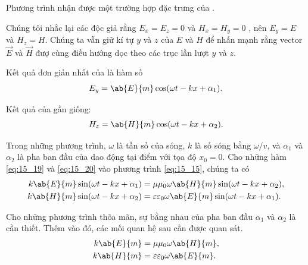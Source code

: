 \noindent
Phương trình nhận được một trường hợp  đặc trưng của .

Chúng tôi nhắc lại các độc giả rằng $E_x=E_z=0$ và $H_x=H_y=0$ , nên $E_y=E$ và $H_z=H$.
Chúng ta vẫn giữ kí tự  $y$ và $z$ của $E$ và $H$ để nhấn mạnh rằng vector $\vec{E}$ và $\vec{H}$ đượ cùng điều hướng dọc theo các trục lần lượt  $y$ và $z$.


Kết quả đơn giản nhất của  là hàm số
\begin{equation}\label{eq:15_19}
    E_y = \ab{E}{m} \cos(\omega t - kx + \alpha_1).
\end{equation}

\noindent
Kết quả của  gần giống:
\begin{equation}\label{eq:15_20}
    H_z = \ab{H}{m} \cos(\omega t - kx + \alpha_2).
\end{equation}

\noindent
Trong những phương trình, $\omega$ là tần số của sóng, $k$ là số sóng bằng $\omega/v$, và $\alpha_1$ và $\alpha_2$ là pha ban đầu của dao động tại điểm với tọa độ $x_0=0$.
Cho những hàm \eqref{eq:15_19} và \eqref{eq:15_20} vào phương trình \eqref{eq:15_15}, chúng ta có
\begin{align*}
    k\ab{E}{m} \sin(\omega t - kx + \alpha_1) &= \mu\mu_0 \omega \ab{H}{m} \sin(\omega t - kx + \alpha_2),\\
    k\ab{H}{m} \sin(\omega t - kx + \alpha_2) &= \varepsilon\varepsilon_0 \omega \ab{E}{m} \sin(\omega t - kx + \alpha_1).
\end{align*}

\noindent
Cho những phương trình thõa mãn, sự bằng nhau của pha ban đầu $\alpha_1$ và $\alpha_2$ là cần thiết.
Thêm vào đó, các mối quan hệ sau cần được quan sát.
\begin{align*}
    k\ab{E}{m} &= \mu\mu_0 \omega \ab{H}{m},\\
    k\ab{H}{m} &= \varepsilon\varepsilon_0 \omega \ab{E}{m}.
\end{align*}

